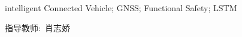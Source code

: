 \vskip 10bp

intelligent Connected Vehicle; GNSS; Functional Safety; LSTM


\vskip 20bp

\begin{flushright}
	\kaishu 指导教师:\ 肖志娇 \hspace{3cm}{ }
\end{flushright}

\label{lastpage}%

